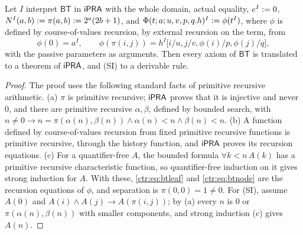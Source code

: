 \begin{proposition}\label{ctr:prop:btI}
Let $I$ interpret $\mathsf{BT}$ in $\mathsf{iPRA}$ with the whole domain, actual equality, $e^I\mathrel{:=} 0$,
$N^I(a,b)\mathrel{:=}\pi(a,b)\mathrel{:=} 2^a(2b+1)$, and $\Phi(t;a;u,v,p,q.h)^I\mathrel{:=}\phi(t^I)$, where
$\phi$ is defined by course-of-values recursion, by external recursion on the term, from
\[
 \phi(0)=a^I,\qquad \phi(\pi(i,j))=h^I\bigl[i/u,j/v,\phi(i)/p,\phi(j)/q\bigr],
\]
with the passive parameters as arguments. Then every axiom of $\mathsf{BT}$ is translated to a
theorem of $\mathsf{iPRA}$, and (SI) to a derivable rule.
\end{proposition}
\begin{proof}
The proof uses the following standard facts of primitive recursive arithmetic.
(a) $\pi$ is primitive recursive; $\mathsf{iPRA}$ proves that it is injective and never $0$, and there
are primitive recursive $\alpha,\beta$, defined by bounded search, with
$n\neq 0\to n=\pi(\alpha(n),\beta(n))\land\alpha(n)<n\land\beta(n)<n$. (b) A function defined by
course-of-values recursion from fixed primitive recursive functions is primitive recursive,
through the history function, and $\mathsf{iPRA}$ proves its recursion equations. (c) For a
quantifier-free $A$, the bounded formula $\forall k<n\,A(k)$ has a primitive recursive
characteristic function, so quantifier-free induction on it gives strong induction for $A$.
With these, \eqref{ctr:eq:btleaf} and \eqref{ctr:eq:btnode} are the recursion equations of
$\phi$, and separation is $\pi(0,0)=1\neq 0$. For (SI), assume $A(0)$ and
$A(i)\land A(j)\to A(\pi(i,j))$; by (a) every $n$ is $0$ or $\pi(\alpha(n),\beta(n))$ with
smaller components, and strong induction (c) gives $A(n)$.
\end{proof}

